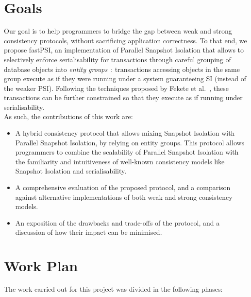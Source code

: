 \section{Goals}

Our goal is to help programmers to bridge the gap between weak and strong consistency protocols, without sacrificing application correctness. To that end, we propose fastPSI, an implementation of Parallel Snapshot Isolation that allows to selectively enforce serialisability for transactions through careful grouping of database objects into \emph{entity groups}~\citep{baker_megastore}: transactions accessing objects in the same group execute as if they were running under a system guaranteeing SI (instead of the weaker PSI). Following the techniques proposed by Fekete et al.~\citep{fekete_ssi}, these transactions can be further constrained so that they execute as if running under serialisability.\\

As such, the contributions of this work are:

\begin{itemize}
    \item A hybrid consistency protocol that allows mixing Snapshot Isolation with Parallel Snapshot Isolation, by relying on entity groups. This protocol allows programmers to combine the scalability of Parallel Snapshot Isolation with the familiarity and intuitiveness of well-known consistency models like Snapshot Isolation and serialisability.

    \item A comprehensive evaluation of the proposed protocol, and a comparison against alternative implementations of both weak and strong consistency models.

    \item An exposition of the drawbacks and trade-offs of the protocol, and a discussion of how their impact can be minimised.
\end{itemize}

\section{Work Plan}

The work carried out for this project was divided in the following phases:

